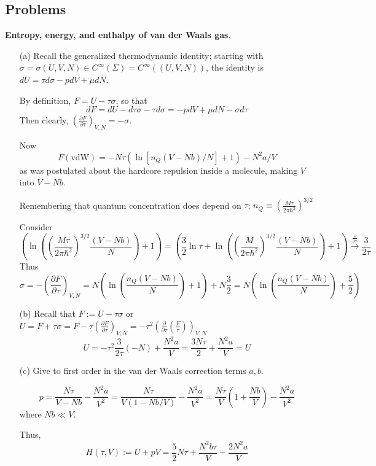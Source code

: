 \documentclass[twoside]{amsart}
\theoremstyle{plain}
\theoremstyle{definition}
\newcommand{\problemhead}[1]
  {
   \noindent{\small\bf Problem #1.}
   }
\begin{document}
\subsection*{Problems}

\problemhead{1} \textbf{Entropy, energy, and enthalpy of van der Waals gas}.  
\begin{enumerate}
\item[(a)]
Recall the generalized thermodynamic identity; starting with $\sigma = \sigma(U,V,N) \in C^{\infty}(\Sigma) = C^{\infty}((U,V,N))$, the identity is $dU = \tau d\sigma - pdV + \mu dN$.  

By definition, $F=U-\tau \sigma$, so that 
\[
dF = dU- d\tau \sigma -\tau d\sigma = - pdV + \mu dN - \sigma d\tau 
\]
Then clearly, $\left( \frac{ \partial F}{ \partial \tau} \right)_{V,N} = -\sigma$.  



Now 
\[
F(\text{vdW}) = -N\tau ( \ln{ [n_Q (V-Nb)/N ]} + 1) - N^2 a /V
\]
as was postulated about the hardcore repulsion inside a molecule, making $V$ into $V-Nb$.  

Remembering that quantum concentration does depend on $\tau$: $n_Q \equiv \left( \frac{ M \tau}{ 2\pi \hbar^2 } \right)^{3/2}$


Consider 
\[
\left( \ln{ ( \left( \frac{M \tau}{ 2\pi \hbar^2} \right)^{3/2} \frac{ (V-Nb)}{ N} )} + 1 \right) = \left( \frac{3}{2} \ln{\tau} + \ln{ \left( \left( \frac{M}{2\pi \hbar^2} \right)^{3/2} \frac{(V-Nb)}{N} \right) } + 1 \right) \xrightarrow{ \frac{ \partial }{\partial \tau} } \frac{3}{2\tau}
\]
Thus
\[
\sigma = - \left( \frac{ \partial F}{ \partial \tau } \right)_{V,N} = N \left( \ln{ \left( \frac{n_Q(V-Nb)}{N} \right) } +1 \right) + N \frac{3}{2} = N \left( \ln{ \left( \frac{n_Q(V-Nb)}{N} \right) } + \frac{5}{2} \right)
\]

\item[(b)] Recall that $F:= U-\tau \sigma$ or $U = F+\tau \sigma = F- \tau \left( \frac{ \partial F}{ \partial \tau} \right)_{V,N} = -\tau^2 \left( \frac{ \partial }{ \partial \tau} \left( \frac{F}{\tau} \right) \right)_{V,N}$  
\[
 U = -\tau^2 \frac{3}{2\tau}(-N) + \frac{N^2a }{V} = \boxed{ \frac{3N\tau}{2} + \frac{N^2a }{V} = U }
\]
\item[(c)] Give to first order in the van der Waals correction terms $a,b$.  

\[
p = \frac{N\tau}{V-Nb} - \frac{N^2a}{V^2} = \frac{N\tau}{ V(1- Nb/V)} - \frac{N^2 a}{V^2} = \frac{N\tau}{V} ( 1 + \frac{Nb}{V} ) - \frac{N^2 a}{V^2}
\]
where $Nb \ll V$.  

Thus,
\[
\boxed{ H(\tau,V) := U + pV = \frac{5}{2} N\tau  + \frac{N^2 b\tau}{V} - \frac{2N^2 a}{V} }
\]
\end{enumerate}
\end{document}
